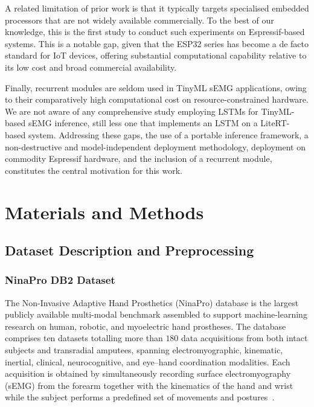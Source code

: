\documentclass[12pt,DIV16,BCOR12mm,a4paper,footinclude=false,headinclude,parskip=half-,twoside,openright,cleardoublepage=empty,toc=index,bibliography=totoc,listof=totoc]{scrreprt}
\numberwithin{equation}{chapter}
\begin{document}
      A related limitation of prior work is that it typically targets specialised embedded
      processors that are not widely available commercially. To the best of our knowledge,
      this is the first study to conduct such experiments on Espressif-based systems. This
      is a notable gap, given that the ESP32 series has become a de facto standard for IoT
      devices, offering substantial computational capability relative to its low cost and
      broad commercial availability.

      Finally, recurrent modules are seldom used in TinyML sEMG applications, owing to their
      comparatively high computational cost on resource-constrained hardware. We are not aware
      of any comprehensive study employing LSTMs for TinyML-based sEMG inference, still less
      one that implements an LSTM on a LiteRT-based system. Addressing these gaps, the use of
      a portable inference framework, a non-destructive and model-independent deployment
      methodology, deployment on commodity Espressif hardware, and the inclusion of a recurrent
      module, constitutes the central motivation for this work.

\chapter{Materials and Methods}

  \section{Dataset Description and Preprocessing}
    \subsection{NinaPro DB2 Dataset}
    The Non-Invasive Adaptive Hand Prosthetics (NinaPro) database is the largest
    publicly available multi-modal benchmark assembled to support machine-learning
    research on human, robotic, and myoelectric hand prostheses. The database
    comprises ten datasets totalling more than $180$ data acquisitions from both
    intact subjects and transradial amputees, spanning electromyographic, kinematic,
    inertial, clinical, neurocognitive, and eye--hand coordination modalities. Each
    acquisition is obtained by simultaneously recording surface electromyography
    (sEMG) from the forearm together with the kinematics of the hand and wrist while
    the subject performs a predefined set of movements and
    postures~\cite{atzoriCharacterizationBenchmarkDatabase2015,ninaproWebsite}.
\end{document}
